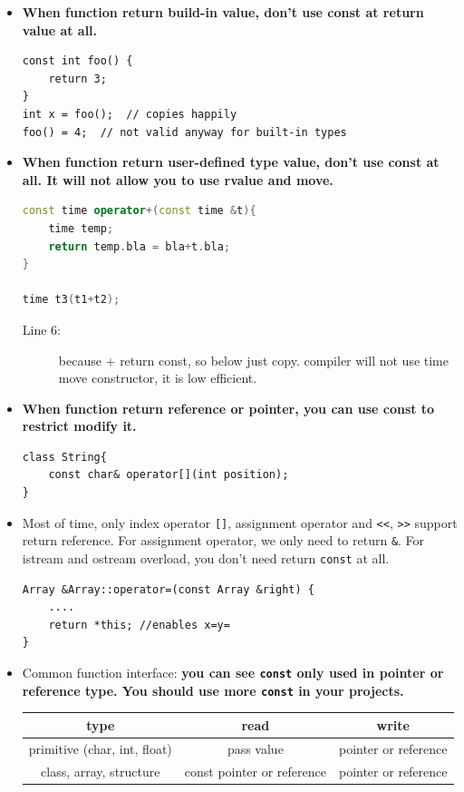 \documentclass[a4paper,11pt,twoside]{book}
\newcommand{\tophline}{\hline }
\newcommand{\bottomhline}{\\ \hline }
\newcommand{\tophline}{ }
\newcommand{\bottomhline}{ }
\begin{document}
\begin{itemize}
	\item \textbf{When function return build-in value, don't use const at return value at all. }
\begin{lstlisting}[numbers=none]
const int foo() {
	return 3;
}
int x = foo();  // copies happily
foo() = 4;  // not valid anyway for built-in types
\end{lstlisting}
	
	\item \textbf{When function return user-defined type value, don't use const at all. It will not allow you to use rvalue and move. }
\begin{lstlisting}[frame=single, language=c++]
const time operator+(const time &t){
	time temp;
	return temp.bla = bla+t.bla;
}

time t3(t1+t2);
\end{lstlisting}
	\begin{description}
		\item[Line 6:] because + return const, so below just copy. compiler will not use time move constructor, it is low efficient.
		
	\end{description}
	
	\item \textbf{When function return reference or pointer, you can use const to restrict modify it.}
\begin{lstlisting}[numbers=none]
class String{
	const char& operator[](int position);
}
\end{lstlisting}
	
	\item Most of time, only index operator \verb=[]=, assignment operator and \verb|<<|, \verb|>>| support return reference. For assignment operator, we only need to return \texttt{\&}.  For istream and ostream overload, you don't need return \texttt{const} at all. 
\begin{lstlisting}[numbers=none]
Array &Array::operator=(const Array &right) {
	....
	return *this; //enables x=y= 
}
\end{lstlisting} 
	
	\item Common function interface: \textbf{you can see \texttt{const} only used in pointer or reference type. You should use more \texttt{const} in your projects. }
	
	\begin{tabular}{|c|c|c|}
		\tophline
		\textbf{type} & \textbf{read} & \textbf{write} \\ \tophline
		
		primitive (char, int, float) & pass value & pointer or reference \\ \tophline
		class, array, structure  & const pointer or reference &  pointer or reference \bottomhline
	\end{tabular}
\end{itemize}
\end{document}
